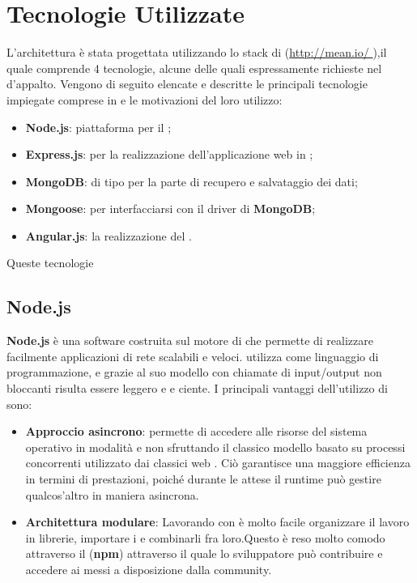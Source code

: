 \section{Tecnologie Utilizzate}
L'architettura è stata progettata utilizzando lo stack di \textbf{} (\url {http://mean.io/ } ),il quale comprende 4 tecnologie, alcune delle quali espressamente richieste nel  d’appalto. Vengono di seguito elencate e descritte le principali tecnologie impiegate comprese in \textbf{} e le motivazioni del loro utilizzo:
\begin{itemize}
\item \textbf{Node.js}: piattaforma per il ;
\item \textbf{Express.js}:  per la realizzazione dell’applicazione web in  ;
\item \textbf{MongoDB}:  di tipo  per la parte di recupero e salvataggio dei dati; 
\item \textbf{Mongoose}:  per interfacciarsi con il driver di \textbf{MongoDB};
\item \textbf{Angular.js}:   la realizzazione del  .
\end{itemize}

Queste tecnologie 
	\subsection{Node.js}
\textbf{Node.js} è una  software costruita sul motore  di  che permette di realizzare facilmente applicazioni di rete scalabili e veloci.  utilizza  come linguaggio di programmazione, e grazie al suo modello  con chiamate di input/output non bloccanti risulta essere leggero e e ciente.
I principali vantaggi dell'utilizzo di  sono:

\begin{itemize}

\item \textbf{Approccio asincrono}:  permette di accedere alle risorse del sistema operativo in modalità  e non sfruttando il classico modello basato su processi concorrenti utilizzato dai classici web . Ciò garantisce una maggiore efficienza in termini di prestazioni, poiché durante le attese il runtime può gestire qualcos’altro in maniera asincrona.

\item \textbf{Architettura modulare}: Lavorando con  è molto facile organizzare il lavoro in librerie, importare i  e combinarli fra loro.Questo è reso molto comodo attraverso il  (\textbf{npm}) attraverso il quale lo sviluppatore può contribuire e accedere ai  messi a disposizione dalla community.
\end{itemize}
